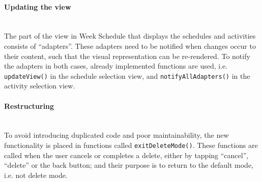 \paragraph{Updating the view}\hfill\\
The part of the view in Week Schedule that displays the schedules and activities consists of \enquote{adapters}.
These adapters need to be notified when changes occur to their content, such that the visual representation can be re-rendered.
To notify the adapters in both cases, already implemented functions are used, i.e. \texttt{updateView()} in the schedule selection view, and \texttt{notifyAllAdapters()} in the activity selection view.

\paragraph{Restructuring} \hfill\\
To avoid introducing duplicated code and poor maintainability, the new functionality is placed in functions called \texttt{exitDeleteMode()}.
These functions are called when the user cancels or completes a delete, either by tapping \enquote{cancel}, \enquote{delete} or the back button;
and their purpose is to return to the default mode, i.e. not delete mode.
